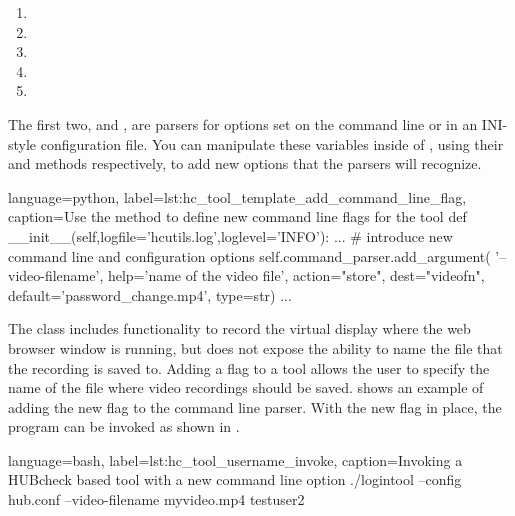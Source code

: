 \begin{enumerate}
\item {}
\item {}
\item {}
\item {}
\item {}
\end{enumerate}

\noindent
The first two,  and ,
are parsers for options set on the command line or in an INI-style
configuration file. You can manipulate these variables inside of
, using their  and
 methods respectively, to add new options that the
parsers will recognize.

\begin{xcode}{%
  language=python,%
  label=lst:hc_tool_template_add_command_line_flag,%
  caption={Use the  method to define new command line flags for the tool}%
}
    def __init__(self,logfile='hcutils.log',loglevel='INFO'):
        ...
        # introduce new command line and configuration options
        self.command_parser.add_argument(
            '--video-filename',
            help='name of the video file',
            action="store",
            dest="videofn",
            default='password_change.mp4',
            type=str)
        ...
\end{xcode}

The  class includes functionality to record the virtual
display where the web browser window is running, but does not expose the
ability to name the file that the recording is saved to. Adding a
 flag to a tool allows the user to specify the
name of the file where video recordings should be saved.
 shows an example of adding
the new  flag to the command line parser.
With the new flag in place, the program can be invoked as shown in
.


\begin{xcode}{%
  language=bash,%
  label=lst:hc_tool_username_invoke,%
  caption={Invoking a HUBcheck based tool with a new command line option}%
}
./logintool --config hub.conf --video-filename myvideo.mp4 testuser2
\end{xcode}



